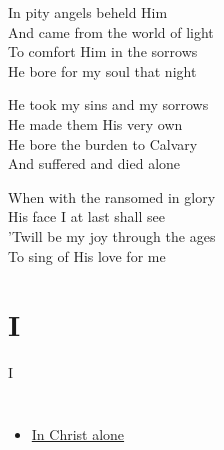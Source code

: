 \documentclass{beamer}
\begin{document}
{\begin{frame}{}
\end{frame}

\hypertarget{I stand amazed['How marvelous']3}{}
\begin{frame}{}
\fontsize{ 20 }{ 27 }\selectfont

In pity angels beheld Him\\ 
And came from the world of light\\ 
To comfort Him in the sorrows\\ 
He bore for my soul that night 

\end{frame}

\hypertarget{I stand amazed['How marvelous']4}{}
\begin{frame}{}
\fontsize{ 20 }{ 27 }\selectfont

He took my sins and my sorrows\\ 
He made them His very own\\ 
He bore the burden to Calvary\\ 
And suffered and died alone 

\end{frame}

\hypertarget{I stand amazed['How marvelous']5}{}
\begin{frame}{}
\fontsize{ 20 }{ 27 }\selectfont

When with the ransomed in glory\\ 
His face I at last shall see\\ 
'Twill be my joy through the ages\\ 
To sing of His love for me 

\end{frame}

}
\section{I}

\begin{frame}{I}
\begin{columns}
    \begin{itemize}
    \item \hyperlink{In Christ alone[]1}{In Christ alone }
\end{itemize}


\end{columns}

\end{frame}
\end{document}
